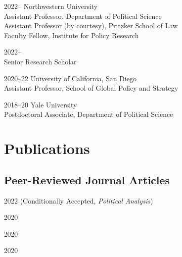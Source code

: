 \documentclass[12pt,letterpaper]{report}
\begin{document}
    \begin{tablist}
        \item[2022--]  \tab{}Northwestern University\\
                        Assistant Professor, Department of Political Science \\
                        Assistant Professor (by courtesy), Pritzker School of Law \\
                        Faculty Fellow, Institute for Policy Research \\
                        
                        
        \item[2022--]   \\
                        Senior Research Scholar \\
                        
        \item[2020--22]   \tab{}University of California, San Diego \\
                             Assistant Professor, School of Global Policy and Strategy \\

        \item[2018--20] \tab{}Yale University \\
                             Postdoctoral Associate, Department of Political Science \\ 

    \end{tablist}
    
    \section*{Publications}

    \subsection*{Peer-Reviewed Journal Articles}
    \begin{tablist}
    \item[2022] \tab{} (Conditionally Accepted, \textit{Political Analysis})
    \item[2020] \tab{}
    
    \item[2020] \tab{}
    
    \item[2020] \tab{}
    \end{tablist}
    
\end{document}
